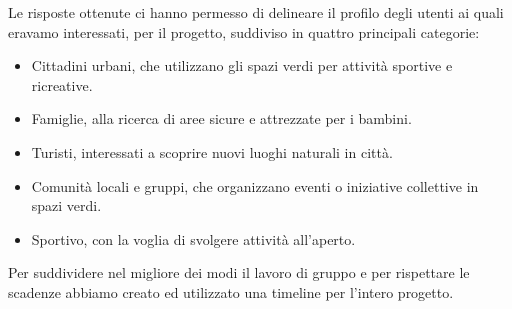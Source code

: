 Le risposte ottenute ci hanno permesso di delineare il profilo degli utenti ai quali eravamo interessati, per il progetto, suddiviso in quattro principali categorie:
\begin{itemize}
    \item Cittadini urbani, che utilizzano gli spazi verdi per attività sportive e ricreative.
    \item Famiglie, alla ricerca di aree sicure e attrezzate per i bambini.
    \item Turisti, interessati a scoprire nuovi luoghi naturali in città.
    \item Comunità locali e gruppi, che organizzano eventi o iniziative collettive in spazi verdi.
    \item Sportivo, con la voglia di svolgere attività all’aperto.
\end{itemize}
Per suddividere nel migliore dei modi il lavoro di gruppo e per rispettare le scadenze  abbiamo creato ed utilizzato una timeline per l’intero progetto.
